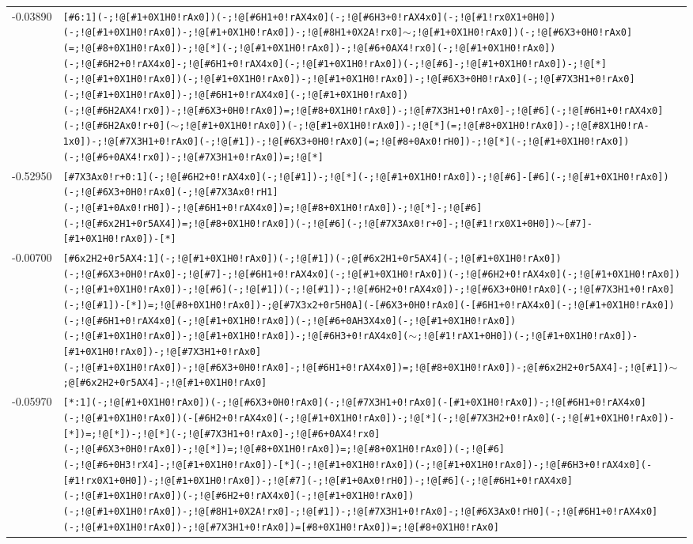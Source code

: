 \begin{longtable}{>{\baselineskip=10pt}p{} >{\baselineskip=10pt}p{}}
-0.03890 & \texttt{[\#6:1](-;!@[\#1+0X1H0!rAx0])(-;!@[\#6H1+0!rAX4x0](-;!@[\#6H3+0!rAX4x0](-;!@[\#1!rx0X1+0H0])(-;!@[\#1+0X1H0!rAx0])-;!@[\#1+0X1H0!rAx0])-;!@[\#8H1+0X2A!rx0]$\sim$;!@[\#1+0X1H0!rAx0])(-;!@[\#6X3+0H0!rAx0](=;!@[\#8+0X1H0!rAx0])-;!@[*](-;!@[\#1+0X1H0!rAx0])-;!@[\#6+0AX4!rx0](-;!@[\#1+0X1H0!rAx0])(-;!@[\#6H2+0!rAX4x0]-;!@[\#6H1+0!rAX4x0](-;!@[\#1+0X1H0!rAx0])(-;!@[\#6]-;!@[\#1+0X1H0!rAx0])-;!@[*](-;!@[\#1+0X1H0!rAx0])(-;!@[\#1+0X1H0!rAx0])-;!@[\#1+0X1H0!rAx0])-;!@[\#6X3+0H0!rAx0](-;!@[\#7X3H1+0!rAx0](-;!@[\#1+0X1H0!rAx0])-;!@[\#6H1+0!rAX4x0](-;!@[\#1+0X1H0!rAx0])(-;!@[\#6H2AX4!rx0])-;!@[\#6X3+0H0!rAx0])=;!@[\#8+0X1H0!rAx0])-;!@[\#7X3H1+0!rAx0]-;!@[\#6](-;!@[\#6H1+0!rAX4x0](-;!@[\#6H2Ax0!r+0]($\sim$;!@[\#1+0X1H0!rAx0])(-;!@[\#1+0X1H0!rAx0])-;!@[*](=;!@[\#8+0X1H0!rAx0])-;!@[\#8X1H0!rA-1x0])-;!@[\#7X3H1+0!rAx0](-;!@[\#1])-;!@[\#6X3+0H0!rAx0](=;!@[\#8+0Ax0!rH0])-;!@[*](-;!@[\#1+0X1H0!rAx0])(-;!@[\#6+0AX4!rx0])-;!@[\#7X3H1+0!rAx0])=;!@[*]} \\ 
-0.52950 & \texttt{[\#7X3Ax0!r+0:1](-;!@[\#6H2+0!rAX4x0](-;!@[\#1])-;!@[*](-;!@[\#1+0X1H0!rAx0])-;!@[\#6]-[\#6](-;!@[\#1+0X1H0!rAx0])(-;!@[\#6X3+0H0!rAx0](-;!@[\#7X3Ax0!rH1](-;!@[\#1+0Ax0!rH0])-;!@[\#6H1+0!rAX4x0])=;!@[\#8+0X1H0!rAx0])-;!@[*]-;!@[\#6](-;!@[\#6x2H1+0r5AX4])=;!@[\#8+0X1H0!rAx0])(-;!@[\#6](-;!@[\#7X3Ax0!r+0]-;!@[\#1!rx0X1+0H0])$\sim$[\#7]-[\#1+0X1H0!rAx0])-[*]} \\ 
-0.00700 & \texttt{[\#6x2H2+0r5AX4:1](-;!@[\#1+0X1H0!rAx0])(-;!@[\#1])(-;@[\#6x2H1+0r5AX4](-;!@[\#1+0X1H0!rAx0])(-;!@[\#6X3+0H0!rAx0]-;!@[\#7]-;!@[\#6H1+0!rAX4x0](-;!@[\#1+0X1H0!rAx0])(-;!@[\#6H2+0!rAX4x0](-;!@[\#1+0X1H0!rAx0])(-;!@[\#1+0X1H0!rAx0])-;!@[\#6](-;!@[\#1])(-;!@[\#1])-;!@[\#6H2+0!rAX4x0])-;!@[\#6X3+0H0!rAx0](-;!@[\#7X3H1+0!rAx0](-;!@[\#1])-[*])=;!@[\#8+0X1H0!rAx0])-;@[\#7X3x2+0r5H0A](-[\#6X3+0H0!rAx0](-[\#6H1+0!rAX4x0](-;!@[\#1+0X1H0!rAx0])(-;!@[\#6H1+0!rAX4x0](-;!@[\#1+0X1H0!rAx0])(-;!@[\#6+0AH3X4x0](-;!@[\#1+0X1H0!rAx0])(-;!@[\#1+0X1H0!rAx0])-;!@[\#1+0X1H0!rAx0])-;!@[\#6H3+0!rAX4x0]($\sim$;!@[\#1!rAX1+0H0])(-;!@[\#1+0X1H0!rAx0])-[\#1+0X1H0!rAx0])-;!@[\#7X3H1+0!rAx0](-;!@[\#1+0X1H0!rAx0])-;!@[\#6X3+0H0!rAx0]-;!@[\#6H1+0!rAX4x0])=;!@[\#8+0X1H0!rAx0])-;@[\#6x2H2+0r5AX4]-;!@[\#1])$\sim$;@[\#6x2H2+0r5AX4]-;!@[\#1+0X1H0!rAx0]} \\ 
-0.05970 & \texttt{[*:1](-;!@[\#1+0X1H0!rAx0])(-;!@[\#6X3+0H0!rAx0](-;!@[\#7X3H1+0!rAx0](-[\#1+0X1H0!rAx0])-;!@[\#6H1+0!rAX4x0](-;!@[\#1+0X1H0!rAx0])(-[\#6H2+0!rAX4x0](-;!@[\#1+0X1H0!rAx0])-;!@[*](-;!@[\#7X3H2+0!rAx0](-;!@[\#1+0X1H0!rAx0])-[*])=;!@[*])-;!@[*](-;!@[\#7X3H1+0!rAx0]-;!@[\#6+0AX4!rx0](-;!@[\#6X3+0H0!rAx0])-;!@[*])=;!@[\#8+0X1H0!rAx0])=;!@[\#8+0X1H0!rAx0])(-;!@[\#6](-;!@[\#6+0H3!rX4]-;!@[\#1+0X1H0!rAx0])-[*](-;!@[\#1+0X1H0!rAx0])(-;!@[\#1+0X1H0!rAx0])-;!@[\#6H3+0!rAX4x0](-[\#1!rx0X1+0H0])-;!@[\#1+0X1H0!rAx0])-;!@[\#7](-;!@[\#1+0Ax0!rH0])-;!@[\#6](-;!@[\#6H1+0!rAX4x0](-;!@[\#1+0X1H0!rAx0])(-;!@[\#6H2+0!rAX4x0](-;!@[\#1+0X1H0!rAx0])(-;!@[\#1+0X1H0!rAx0])-;!@[\#8H1+0X2A!rx0]-;!@[\#1])-;!@[\#7X3H1+0!rAx0]-;!@[\#6X3Ax0!rH0](-;!@[\#6H1+0!rAX4x0](-;!@[\#1+0X1H0!rAx0])-;!@[\#7X3H1+0!rAx0])=[\#8+0X1H0!rAx0])=;!@[\#8+0X1H0!rAx0]} \\ 

\end{longtable}
